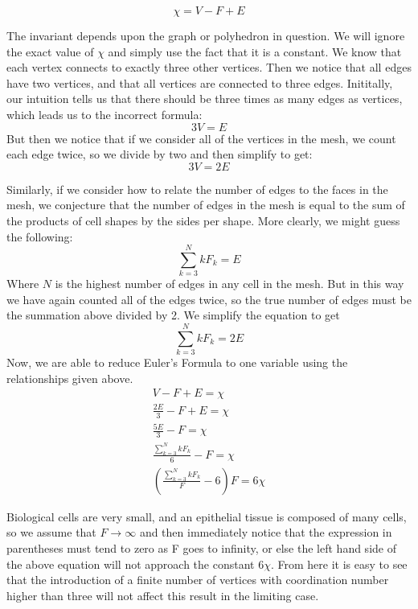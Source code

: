 \begin{equation}
\chi = V - F + E
\end{equation}

The invariant depends upon the graph or polyhedron in question. We will ignore the exact value of $\chi$ and simply use the fact that it is a constant. We know that each vertex connects to exactly three other vertices. Then we notice that all edges have two vertices, and that all vertices are connected to three edges. Inititally, our intuition tells us that there should be three times as many edges as vertices, which leads us to the incorrect formula:
\begin{equation}
3V = E
\end{equation}
But then we notice that if we consider all of the vertices in the mesh, we count each edge twice, so we divide by two and then simplify to get:
\begin{equation}
3V = 2E
\end{equation}

Similarly, if we consider how to relate the number of edges to the faces in the mesh, we conjecture that the number of edges in the mesh is equal to the sum of the products of cell shapes by the sides per shape. More clearly, we might guess the following:
\begin{equation}
\sum_{k=3}^N kF_k = E
\end{equation}
Where $N$ is the highest number of edges in any cell in the mesh. But in this way we have again counted all of the edges twice, so the true number of edges must be the summation above divided by 2. We simplify the equation to get
\begin{equation}
\sum_{k=3}^N kF_k = 2E
\end{equation}
Now, we are able to reduce Euler's Formula to one variable using the relationships given above.
\begin{gather}
V - F + E = \chi\\
\frac{2E}3 - F + E = \chi\\
\frac{5E}3 - F = \chi\\
\frac{\sum_{k=3}^N kF_k}{6} - F = \chi\\
(\frac{\sum_{k=3}^N kF_k}{F} - 6)F = 6\chi
\end{gather}

Biological cells are very small, and an epithelial tissue is composed of many cells, so we assume that $F\to\infty$ and then immediately notice that the expression in parentheses must tend to zero as F goes to infinity, or else the left hand side of the above equation will not approach the constant $6\chi$. From here it is easy to see that the introduction of a finite number of vertices with coordination number higher than three will not affect this result in the limiting case.

